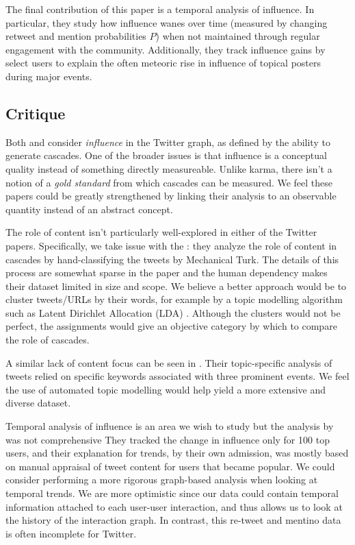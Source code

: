 \documentclass[10pt]{article}
\begin{document}
The final contribution of this paper is a temporal analysis of influence. In
particular, they study how influence wanes over time (measured by changing retweet
and mention probabilities $P$) when not maintained through regular engagement
with the community. Additionally, they track influence gains by select users
to explain the often meteoric rise in influence of topical posters during major
events.

\subsection{Critique} 
Both \citet{bakshy2011everyone} and
\citet{cha2010measuring} consider \textit{influence} in the Twitter graph, as
defined by the ability to generate cascades. One of the broader issues is that
influence is a conceptual quality instead of something directly measureable.
Unlike karma, there isn't a notion of a \textit{gold standard} from which
cascades can be measured.  We feel these papers could be greatly strengthened
by linking their analysis to an observable quantity instead of an abstract
concept.

The role of content isn't particularly well-explored in either of the Twitter papers.
Specifically, we take issue with the \citet{bakshy2011everyone}: they analyze
the role of content in cascades by hand-classifying the tweets by Mechanical Turk.
The details of this process are somewhat sparse in the paper and the human
dependency makes their dataset limited in size and scope. We believe a better
approach would be to cluster tweets/URLs by their words, for example by
a topic modelling algorithm such as Latent Dirichlet Allocation (LDA)
\citep{blei2003latent}. Although the clusters would not be perfect, the assignments
would give an objective category by which to compare the role of cascades.

A similar lack of content focus can be seen in \citet{cha2010measuring}. Their
topic-specific analysis of tweets relied on specific keywords associated with
three prominent events. We feel the use of automated topic modelling would help
yield a more extensive and diverse dataset.

Temporal analysis of influence is an area we wish to study but
the analysis by \citet{cha2010measuring} was not comprehensive
They tracked the change in influence only for 100 top users, and
their explanation for trends, by their own admission, was mostly 
based on manual appraisal of tweet content for users that became popular.
We could consider performing a more rigorous graph-based analysis when looking at temporal
trends. We are more optimistic since our data
could contain temporal information attached to each user-user interaction,
and thus allows us to look at the history of the interaction graph. In contrast, this
re-tweet and mentino data is often incomplete for Twitter.
\end{document}
